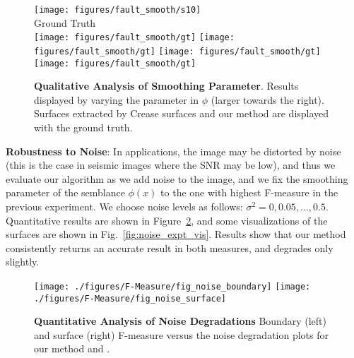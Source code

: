 \documentclass[10pt,journal,compsoc]{IEEEtran}
\begin{document}
\begin{figure}
{    %
    \texttt{[image: figures/fault\_smooth/s10]} \\
    Ground Truth \\
    \texttt{[image: figures/fault\_smooth/gt]} 
    \texttt{[image: figures/fault\_smooth/gt]} 
    \texttt{[image: figures/fault\_smooth/gt]} 
    \texttt{[image: figures/fault\_smooth/gt]} \\
}
\caption{{\bf Qualitative Analysis of Smoothing Parameter}. Results
  displayed by varying the parameter in $\phi$ (larger towards the
  right). Surfaces extracted by Crease surfaces and our method are
  displayed with the ground truth. }
\label{fig:smoothing_degrad_vis}
\end{figure}

{\bf Robustness to Noise}: In applications, the image may be distorted
by noise (this is the case in seismic images where the SNR may be
low), and thus we evaluate our algorithm as we add noise to the image,
and we fix the smoothing parameter of the semblance $\phi(x)$ to the
one with highest F-measure in the previous experiment. We choose noise
levels as follows: $\sigma^2 = 0, 0.05, \ldots, 0.5$. Quantitative
results are shown in Figure~\ref{fig:noise_expt}, and some
visualizations of the surfaces are shown in
Fig.~\ref{fig:noise_expt_vis}. Results show that our method
consistently returns an accurate result in both measures, and degrades
only slightly.

\begin{figure}
  \centering
  \texttt{[image: ./figures/F-Measure/fig\_noise\_boundary]}
  \texttt{[image: ./figures/F-Measure/fig\_noise\_surface]}
  \caption{ {\bf Quantitative Analysis of Noise Degradations}
    Boundary (left) and surface (right)  F-measure versus the noise degradation plots for our method and \cite{schultz2010crease}.
  }
  \label{fig:noise_expt}
\end{figure}
\end{document}
